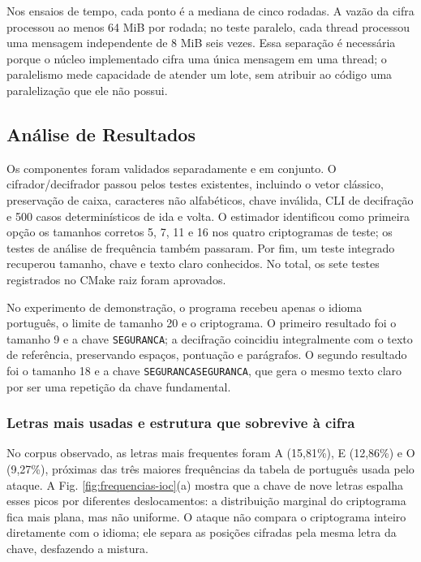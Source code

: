 \documentclass[conference]{IEEEtran}
\begin{document}
Nos ensaios de tempo, cada ponto é a mediana de cinco rodadas. A vazão da
cifra processou ao menos 64 MiB por rodada; no teste paralelo, cada thread
processou uma mensagem independente de 8 MiB seis vezes. Essa separação é
necessária porque o núcleo implementado cifra uma única mensagem em uma
thread; o paralelismo mede capacidade de atender um lote, sem atribuir ao
código uma paralelização que ele não possui.

\subsection{Análise de Resultados}

Os componentes foram validados separadamente e em conjunto. O
cifrador/decifrador passou pelos testes existentes, incluindo o vetor
clássico, preservação de caixa, caracteres não alfabéticos, chave
inválida, CLI de decifração e 500 casos determinísticos de ida e volta.
O estimador identificou como
primeira opção os tamanhos corretos 5, 7, 11 e 16 nos quatro
criptogramas de teste; os testes de análise de frequência também
passaram. Por fim, um teste integrado recuperou tamanho, chave e texto
claro conhecidos. No total, os sete testes registrados no CMake raiz
foram aprovados.

No experimento de demonstração, o programa recebeu apenas o idioma
português, o limite de tamanho 20 e o criptograma. O primeiro resultado
foi o tamanho 9 e a chave \texttt{SEGURANCA}; a decifração coincidiu
integralmente com o texto de referência, preservando espaços,
pontuação e parágrafos. O segundo resultado foi o tamanho 18 e a chave
\texttt{SEGURANCASEGURANCA}, que gera o mesmo texto claro por ser uma
repetição da chave fundamental.

\subsubsection{Letras mais usadas e estrutura que sobrevive à cifra}

No corpus observado, as letras mais frequentes foram A (15,81\%), E
(12,86\%) e O (9,27\%), próximas das três maiores frequências da tabela
de português usada pelo ataque. A Fig. \ref{fig:frequencias-ioc}(a) mostra
que a chave de nove letras espalha esses picos por diferentes deslocamentos:
a distribuição marginal do criptograma fica mais plana, mas não uniforme.
O ataque não compara o criptograma inteiro diretamente com o idioma; ele
separa as posições cifradas pela mesma letra da chave, desfazendo a mistura.
\end{document}
